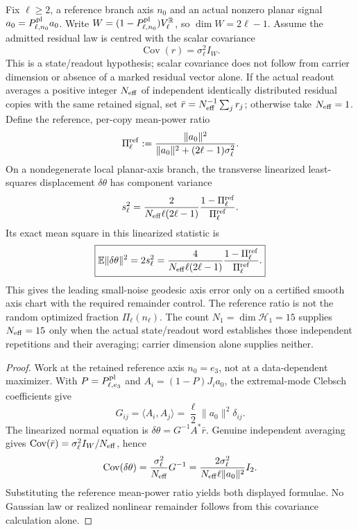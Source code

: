 \documentclass[12pt,a4paper]{article}
\begin{document}
\begin{theorem}
\label{p8:thm:finite-mode-axis-scatter}
Fix $\ell\ge2$, a reference branch axis $n_0$ and an actual nonzero planar
signal $a_0=P_{\ell,n_0}^{\rm pl}a_0$.  Write
$W=(1-P_{\ell,n_0}^{\rm pl})V_\ell^{\mathbb R}$, so $\dim W=2\ell-1$.
Assume the admitted residual law is centred with the scalar covariance
\[
 \operatorname{Cov}(r)=\sigma_\ell^2 I_W.
\]
This is a state/readout hypothesis; scalar covariance does not follow from
carrier dimension or absence of a marked residual vector alone.
If the actual readout averages a positive integer $N_{\rm eff}$ of independent
identically distributed residual copies with the same retained signal, set
$\bar r=N_{\rm eff}^{-1}\sum_jr_j$; otherwise take $N_{\rm eff}=1$.
Define the reference, per-copy mean-power ratio
\[
 \Pi_\ell^{\rm ref}
 :=\frac{\|a_0\|^2}{\|a_0\|^2+(2\ell-1)\sigma_\ell^2}.
\]
On a nondegenerate local planar-axis branch, the transverse linearized
least-squares displacement $\delta\theta$ has component variance
\begin{equation}
\label{p8:eq:finite-axis-component-variance}
 s_\ell^2
 =\frac{2}{N_{\rm eff}\ell(2\ell-1)}
   \frac{1-\Pi_\ell^{\rm ref}}{\Pi_\ell^{\rm ref}}.
\end{equation}
Its exact mean square in this linearized statistic is
\begin{equation}
\label{p8:eq:finite-axis-ms-error}
 \boxed{\mathbb E\|\delta\theta\|^2=2s_\ell^2
 =\frac{4}{N_{\rm eff}\ell(2\ell-1)}
   \frac{1-\Pi_\ell^{\rm ref}}{\Pi_\ell^{\rm ref}}.}
\end{equation}
This gives the leading small-noise geodesic axis error only on a certified
smooth axis chart with the required remainder control.  The reference ratio
is not the random optimized fraction $\Pi_\ell(n_\ell)$.
The count $N_1=\dim\mathcal H_1=15$ supplies $N_{\rm eff}=15$ only when
the actual state/readout word establishes those independent repetitions and
their averaging; carrier dimension alone supplies neither.
\end{theorem}
\begin{proof}
Work at the retained reference axis $n_0=e_3$, not at a data-dependent
maximizer.  With $P=P_{\ell,e_3}^{\rm pl}$ and
$A_i=(1-P)J_i a_0$, the extremal-mode Clebsch coefficients give
\[
 G_{ij}=\langle A_i,A_j\rangle
 =\frac\ell2\|a_0\|^2\delta_{ij}.
\]
The linearized normal equation is
$\delta\theta=G^{-1}A^*\bar r$.  Genuine independent averaging gives
$\operatorname{Cov}(\bar r)=\sigma_\ell^2 I_W/N_{\rm eff}$, hence
\[
 \operatorname{Cov}(\delta\theta)
 =\frac{\sigma_\ell^2}{N_{\rm eff}}G^{-1}
 =\frac{2\sigma_\ell^2}{N_{\rm eff}\ell\|a_0\|^2}I_2.
\]
Substituting the reference mean-power ratio yields both displayed formulae.
No Gaussian law or realized nonlinear remainder follows from this covariance
calculation alone.
\end{proof}
\end{document}
